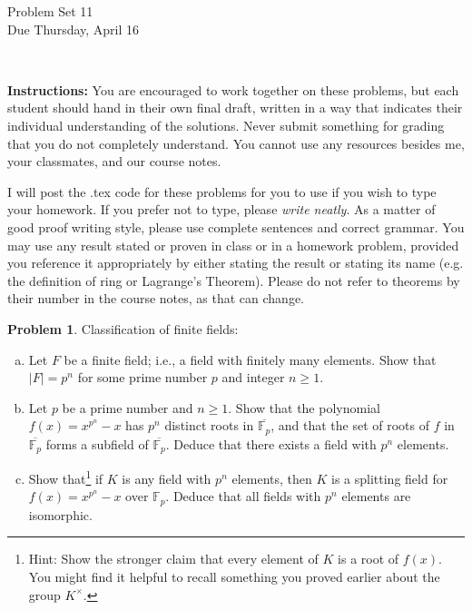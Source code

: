 \documentclass[11pt]{article}
\title{}
\date{\vspace{-0.5in}}
\theoremstyle{definition}
\newtheorem{problem}{Problem}
\begin{document}
\thispagestyle{fancy}
\pagestyle{fancy}

\vspace{3em}

\begin{center}
	{\LARGE Problem Set 11 \\}
	Due Thursday, April 16\end{center}

\

\noindent
{\bf Instructions:}
You are encouraged to work together on these problems, but each student should hand in their own final draft, written in a way that indicates their individual understanding of the solutions. Never submit something for grading that you do not completely understand. You cannot use any resources besides me, your classmates, and our course notes.


I will post the .tex code for these problems for you to use if you wish to type your homework. If you prefer not to type, please  {\em write neatly}. As a matter of good proof writing style, please use complete sentences and correct grammar. You may use any result stated or proven in class or in a homework problem, provided you reference it appropriately by either stating the result or stating its name (e.g. the definition of ring or Lagrange's Theorem). Please do not refer to theorems by their number in the course notes, as that can change.



\begin{problem} Classification of finite fields:
\begin{enumerate}[(a)]
\item Let $F$ be a finite field; i.e., a field with finitely many elements. Show that $|F|=p^n$ for some prime number $p$ and integer $n\geq 1$.
\item Let $p$ be a prime number and $n\geq 1$. Show that the polynomial $f(x)=x^{p^n}-x$ has $p^n$ distinct roots in $\overline{\mathbb{F}_p}$, and that the set of roots of $f$ in $\overline{\mathbb{F}_p}$ forms a subfield of $\overline{\mathbb{F}_p}$. Deduce that there exists a field with $p^n$ elements.
\item Show that\footnote{Hint: Show the stronger claim that every element of $K$ is a root of $f(x)$. You might find it helpful to recall something you proved earlier about the group $K^\times$.} if $K$ is any field with $p^n$ elements, then $K$ is a splitting field for $f(x)=x^{p^n}-x$ over $\mathbb{F}_p$. Deduce that all fields with $p^n$ elements are isomorphic.
\end{enumerate}
\end{problem}
\end{document}
